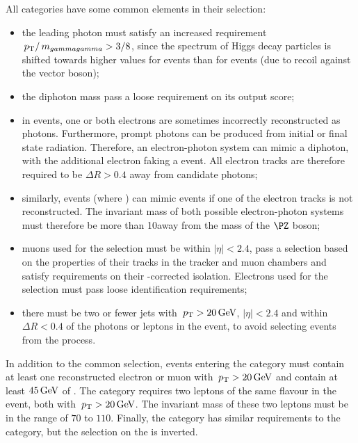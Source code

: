All \VHLeptonicTag categories have some common elements in their selection:
\begin{itemize}
\item the leading photon must satisfy an increased requirement $\,p_\text{T}/\,m_{gammagamma} > 3/8$, since the \pT spectrum of Higgs decay particles is shifted towards higher values for \VH events than for \ggH events (due to recoil against the vector boson);
\item the diphoton mass pass a loose requirement on its \DiPhoBdt output score; %
\item in \DY events, one or both electrons are sometimes incorrectly reconstructed as photons. Furthermore, prompt photons can be produced from initial or final state radiation. Therefore, an electron-photon system can mimic a diphoton, with the additional electron faking a \VH event. All electron tracks are therefore required to be $\Delta R > 0.4$ away from candidate photons;
\item similarly, \Zg events (where \Zee) can mimic \VH events if one of the electron tracks is not reconstructed. The invariant mass of both possible electron-photon systems must therefore be more than 10\GeV away from the mass of the $\PZ$ boson;
\item muons used for the selection must be within $|\eta|<2.4$, pass a selection based on the properties of their tracks in the tracker and muon chambers and satisfy requirements on their \PU-corrected isolation. Electrons used for the selection must pass loose identification requirements;
\item there must be two or fewer jets with $\,p_\text{T}>20\,\text{Ge\hspace{-.08em}V}$, $|\eta|<2.4$ and within $\Delta R <0.4$ of the photons or leptons in the event, to avoid selecting events from the \ttH process. 
\end{itemize}

In addition to the common selection, events entering the \WHLeptonicTag category must contain at least one reconstructed electron or muon with $\,p_\text{T} > 20\,\text{Ge\hspace{-.08em}V}$ and contain at least $45\,\text{Ge\hspace{-.08em}V}$ of \MET. The \ZHLeptonicTag category requires two leptons of the same flavour in the event, both with $\,p_\text{T}>20\,\text{Ge\hspace{-.08em}V}$. The invariant mass of these two leptons must be in the range of $70$ to $110$\GeV. Finally, the \VHLeptonicLooseTag category has similar requirements to the \WHLeptonicTag category, but the selection on the \MET is inverted.

